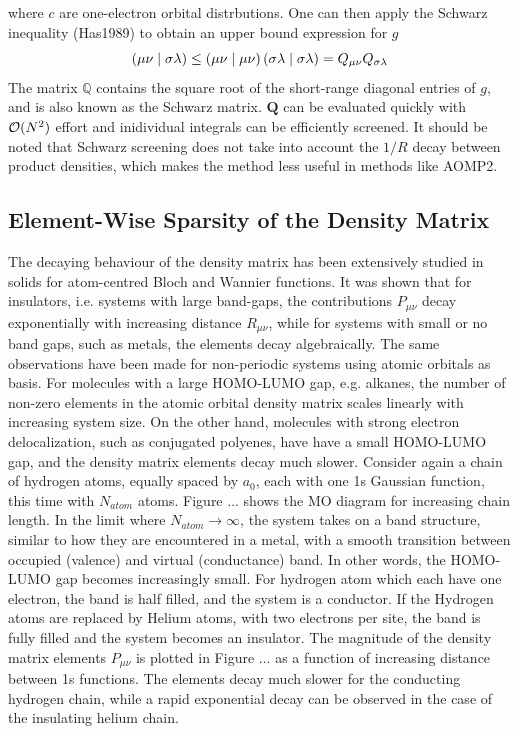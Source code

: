 \noindent where $c$ are one-electron orbital distrbutions. One can then apply the Schwarz inequality (Has1989) to obtain an upper bound expression for $g$
\begin{equation}
\left( \mu\nu \mid \sigma\lambda \right) \leq \left( \mu\nu \mid \mu\nu \right) \left( \sigma\lambda \mid \sigma\lambda \right) = Q_{\mu\nu} Q_{\sigma\lambda}
\end{equation}
\noindent The matrix $\mathbb{Q}$ contains the square root of the short-range diagonal entries of $g$, and is also known as the Schwarz matrix. $\mathbf{Q}$ can be evaluated quickly with $\mathcal{O}(N^{2})$ effort and inidividual integrals can be efficiently screened. It should be noted that Schwarz screening does not take into account the $1/R$ decay between product densities, which makes the method less useful in methods like AOMP2.

\subsection{Element-Wise Sparsity of the Density Matrix}

The decaying behaviour of the density matrix has been extensively studied in solids for atom-centred Bloch and Wannier functions. It was shown that for insulators, i.e. systems with large band-gaps, the contributions $P_{\mu\nu}$ decay exponentially with increasing distance $R_{\mu\nu}$, while for systems with small or no band gaps, such as metals, the elements decay algebraically. 
The same observations have been made for non-periodic systems using atomic orbitals as basis. For molecules with a large HOMO-LUMO gap, e.g. alkanes, the number of non-zero elements in the atomic orbital density matrix scales linearly with increasing system size. On the other hand, molecules with strong electron delocalization, such as conjugated polyenes, have have a small HOMO-LUMO gap, and the density matrix elements decay much slower. 
Consider again a chain of hydrogen atoms, equally spaced by $a_0$, each with one 1s Gaussian function, this time with $N_{atom}$ atoms. Figure ... shows the MO diagram for increasing chain length. In the limit where $N_{atom} \rightarrow \infty$, the system takes on a band structure, similar to how they are encountered in a metal, with a smooth transition between occupied (valence) and virtual (conductance) band. In other words, the HOMO-LUMO gap becomes increasingly small. For hydrogen atom which each have one electron, the band is half filled, and the system is a conductor. If the Hydrogen atoms are replaced by Helium atoms, with two electrons per site, the band is fully filled and the system becomes an insulator.
The magnitude of the density matrix elements $P_{\mu\nu}$ is plotted in Figure ... as a function of increasing distance between 1s functions. The elements decay much slower for the conducting hydrogen chain, while a rapid exponential decay can be observed in the case of the insulating helium chain. 

